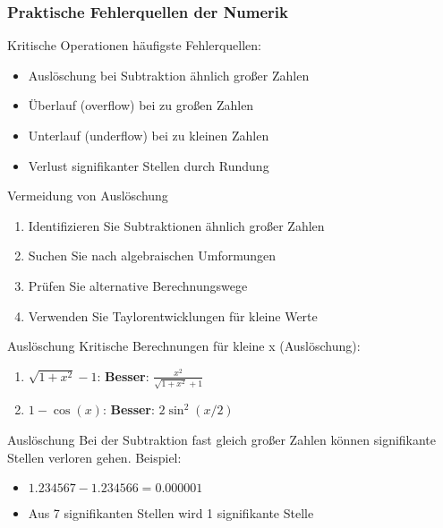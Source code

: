 \subsubsection{Praktische Fehlerquellen der Numerik}

\begin{concept}{Kritische Operationen} häufigste Fehlerquellen:
\begin{itemize}
    \item Auslöschung bei Subtraktion ähnlich großer Zahlen
    \item Überlauf (overflow) bei zu großen Zahlen
    \item Unterlauf (underflow) bei zu kleinen Zahlen
    \item Verlust signifikanter Stellen durch Rundung
\end{itemize}
\end{concept}

\begin{KR}{Vermeidung von Auslöschung}
\begin{enumerate}
    \item Identifizieren Sie Subtraktionen ähnlich großer Zahlen
    \item Suchen Sie nach algebraischen Umformungen
    \item Prüfen Sie alternative Berechnungswege
    \item Verwenden Sie Taylorentwicklungen für kleine Werte
\end{enumerate}
\end{KR}

\begin{example2}{Auslöschung} Kritische Berechnungen für kleine x (Auslöschung):
\begin{enumerate}
    \item $\sqrt{1 + x^2} - 1$: \textbf{Besser}: $\frac{x^2}{\sqrt{1 + x^2} + 1}$
    \item $1 - \cos(x)$: \textbf{Besser}: $2\sin^2(x/2)$
\end{enumerate}
\end{example2}

\begin{remark2}{Auslöschung}
    Bei der Subtraktion fast gleich großer Zahlen können signifikante Stellen verloren gehen. Beispiel:
    \begin{itemize}
        \item $1.234567 - 1.234566 = 0.000001$
        \item Aus 7 signifikanten Stellen wird 1 signifikante Stelle
    \end{itemize}
\end{remark2}


